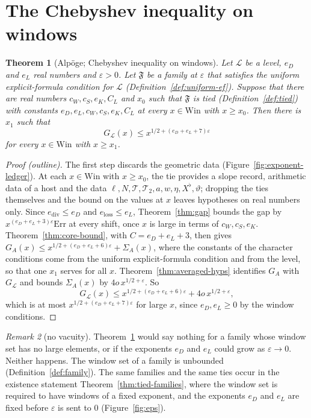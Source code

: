 \documentclass[11pt]{amsbook}
\theoremstyle{plain}
\newtheorem{theorem}{Theorem}[section]
\theoremstyle{definition}
\theoremstyle{remark}
\newtheorem{remark}[theorem]{Remark}
\numberwithin{equation}{section}
\numberwithin{figure}{chapter}
\numberwithin{table}{chapter}
\newcommand{\eps}{\varepsilon}
\newcommand{\lev}{\mathscr{L}}
\newcommand{\Top}{\mathcal{T}}
\newcommand{\Err}{\mathrm{Err}}
\newcommand{\Fam}{\mathfrak{F}}
\newcommand{\Win}{\mathrm{Win}}
\begin{document}
\section{The Chebyshev inequality on windows}
\begin{figure}[tbp]
\centering

\end{figure}

\begin{theorem}[Alp\"oge; Chebyshev inequality on windows]
\label{thm:chebyshev-windows}
Let $\lev$ be a level, $e_D$ and $e_L$ real numbers and $\eps>0$. Let
$\Fam$ be a family at $\eps$ that satisfies the uniform
explicit-formula condition for $\lev$ (Definition~\ref{def:uniform-ef}).
Suppose that there are real numbers $c_W,c_S,e_K,C_L$ and $x_0$ such
that $\Fam$ is tied (Definition~\ref{def:tied}) with constants
$e_D,e_L,c_W,c_S,e_K,C_L$ at every $x\in\Win$ with $x\ge x_0$. Then
there is $x_1$ such that
\[
G_\lev(x)\le x^{1/2+(e_D+e_L+7)\eps}
\]
for every $x\in\Win$ with $x\ge x_1$.
\end{theorem}

\begin{proof}[Proof (outline)]
The first step discards the geometric data (Figure~\ref{fig:exponent-ledger}). At each $x\in\Win$
with $x\ge x_0$, the
tie provides a slope record, arithmetic data of a host and the data
$\ell,N,\Top,\Top_2,a,w,\eta,X^\flat,\vartheta$; dropping the ties
themselves and the bound on the values at $x$ leaves hypotheses on
real numbers only. Since $e_{\mathrm{div}}\le e_D$ and
$e_{\mathrm{loss}}\le e_L$, Theorem~\ref{thm:gap} bounds the gap by
$x^{(e_D+e_L+3)\eps}\Err$ at every shift, once $x$ is large in terms
of $c_W,c_S,e_K$. Theorem~\ref{thm:core-bound}, with $C=e_D+e_L+3$,
then gives $G_A(x)\le x^{1/2+(e_D+e_L+6)\eps}+\Sigma_A(x)$, where the
constants of the character conditions come from the uniform
explicit-formula condition and from the level, so that one $x_1$
serves for all $x$. Theorem~\ref{thm:averaged-hyps} identifies $G_A$
with $G_\lev$ and bounds $\Sigma_A(x)$ by $4o\,x^{1/2+\eps}$. So
\[
G_\lev(x)\le x^{1/2+(e_D+e_L+6)\eps}+4o\,x^{1/2+\eps},
\]
which is at most $x^{1/2+(e_D+e_L+7)\eps}$ for large $x$, since
$e_D,e_L\ge0$ by the window conditions.
\end{proof}

\begin{remark}[no vacuity]\label{rem:no-vacuity}
Theorem~\ref{thm:chebyshev-windows} would say nothing for a family whose
window set has no large elements, or if the exponents $e_D$ and $e_L$
could grow as $\eps\to0$. Neither happens. The window set of a family
is unbounded (Definition~\ref{def:family}). The same families and the
same ties occur in the existence statement
Theorem~\ref{thm:tied-families}, where the window set is required to
have windows of a fixed exponent, and the exponents $e_D$ and $e_L$
are fixed before $\eps$ is sent to $0$ (Figure~\ref{fig:eps}).
\end{remark}
\end{document}
